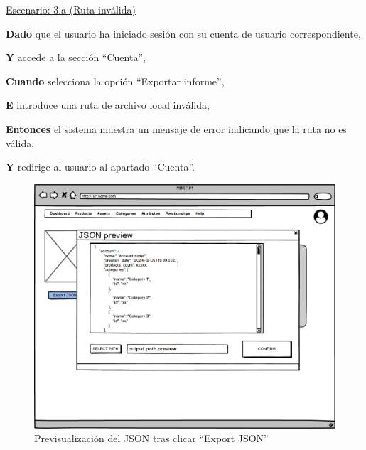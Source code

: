 \underline{Escenario: 3.a (Ruta inválida)}\par
\vspace{0.15cm}
\textbf{Dado} que el usuario ha iniciado sesión con su cuenta de usuario correspondiente,\par 
\textbf{Y} accede a la sección \enquote{Cuenta},\par 
\textbf{Cuando} selecciona la opción \enquote{Exportar informe}, \par
\textbf{E} introduce una ruta de archivo local inválida,\par
\textbf{Entonces} el sistema muestra un mensaje de error indicando que la ruta no es válida, \par
\textbf{Y} redirige al usuario al apartado \enquote{Cuenta}.\par
\vspace{0.20cm}

\begin{figure}[H]
    \includegraphics[width=1\linewidth]{mockups/RF1.9.1ExportarInformeCuenta.png}
    \caption{Previsualización del JSON tras clicar \enquote{Export JSON}}
   \end{figure}
\vspace{1.0cm}

\newpage %